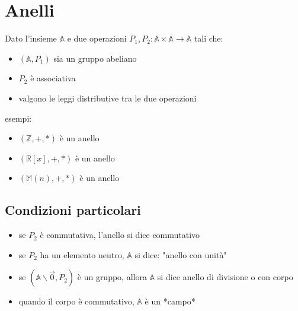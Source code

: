 \documentclass{article}
\begin{document}
\section{Anelli}

Dato l'insieme $\mathbb{A}$ e due operazioni $P_1,P_2: \mathbb{A} \times \mathbb{A} \to \mathbb{A}$ tali che:

\begin{itemize}
    \item $(\mathbb{A}, P_1)$ sia un gruppo abeliano
    \item $P_2$ è associativa
    \item valgono le leggi distributive tra le due operazioni
\end{itemize}

\noindent
esempi:

\begin{itemize}
    \item $(\mathbb{Z}, +, *)$ è un anello
    \item $(\mathbb{R}[x], +, *)$ è un anello
    \item $(\mathbb{M}(n), +, *)$ è un anello
\end{itemize}

\subsection{Condizioni particolari}

\begin{itemize}
    \item se $P_2$ è commutativa, l'anello si dice commutativo
    \item se $P_2$ ha un elemento neutro, $\mathbb{A}$ si dice: "anello con unità"
    \item se $(\mathbb{A} \backslash \vec{0}, P_2)$ è un gruppo, allora $\mathbb{A}$ si dice anello di divisione o con corpo
    \item quando il corpo è commutativo, $\mathbb{A}$ è un *campo*
\end{itemize}
\end{document}
